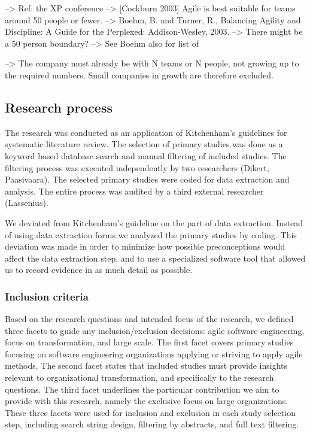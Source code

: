 \documentclass[preprint,authoryear,12pt]{elsarticle}
\begin{document}
--> Ref: the XP conference
--> [Cockburn 2003] Agile is best suitable for teams around 50 people or fewer.
--> Boehm, B. and Turner, R., Balancing Agility and Discipline: A Guide for the
    Perplexed: Addison-Wesley, 2003. --> There might be a 50 person boundary?
    --> See Boehm also for list of 

--> The company must already be with N teams or N people, not growing up to the
    required numbers. Small companies in growth are therefore excluded. 


\subsection{Research process}

The research was conducted as an application of Kitchenham's
\cite{Kitchenham2007} guidelines for systematic literature review. The selection
of primary studies was done as a keyword based database search and manual
filtering of included studies. The filtering process was executed independently
by two researchers (Dikert, Paasivaara). The selected primary studies were coded
for data extraction and analysis. The entire process was audited by a third
external researcher (Lassenius).

We deviated from Kitchenham's guideline on the part of data extraction. Instead
of using data extraction forms we analyzed the primary studies by coding. This
deviation was made in order to minimize how possible preconceptions would affect
the data extraction step, and to use a specialized software tool that allowed us
to record evidence in as much detail as possible.

\subsubsection{Inclusion criteria}
\label{sec:inclusioncriteria}

Based on the research questions and intended focus of the research, we defined
three facets to guide any inclusion/exclusion decisions: agile software
engineering, focus on transformation, and large scale. The first facet
covers primary studies focusing on software engineering organizations applying
or striving to apply agile methods. The second facet states that included
studies must provide insights relevant to organizational transformation, and
specifically to the research questions. The third facet underlines the
particular contribution we aim to provide with this research, namely the
exclusive focus on large organizations. These three facets were used for
inclusion and exclusion in each study selection step, including search string
design, filtering by abstracts, and full text filtering.
\end{document}
